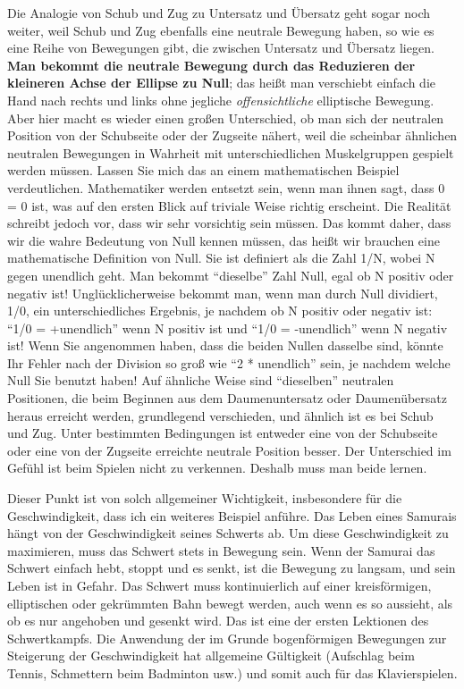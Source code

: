 Die Analogie von Schub und Zug zu Untersatz und Übersatz geht sogar noch weiter, weil Schub und Zug ebenfalls eine neutrale Bewegung haben, so wie es eine Reihe von Bewegungen gibt, die zwischen Untersatz und Übersatz liegen.
\textbf{Man bekommt die neutrale Bewegung durch das Reduzieren der kleineren Achse der Ellipse zu Null}; das heißt man verschiebt einfach die Hand nach rechts und links ohne jegliche \textit{offensichtliche} elliptische Bewegung.
Aber hier macht es wieder einen großen Unterschied, ob man sich der neutralen Position von der Schubseite oder der Zugseite nähert, weil die scheinbar ähnlichen neutralen Bewegungen in Wahrheit mit unterschiedlichen Muskelgruppen gespielt werden müssen.
Lassen Sie mich das an einem mathematischen Beispiel verdeutlichen.
Mathematiker werden entsetzt sein, wenn man ihnen sagt, dass 0 = 0 ist, was auf den ersten Blick auf triviale Weise  richtig erscheint.
Die Realität schreibt jedoch vor, dass wir sehr vorsichtig sein müssen.
Das kommt daher, dass wir die wahre Bedeutung von Null kennen müssen, das heißt wir brauchen eine mathematische Definition von Null.
Sie ist definiert als die Zahl 1/N, wobei N gegen unendlich geht.
Man bekommt \enquote{dieselbe} Zahl Null, egal ob N positiv oder negativ ist!
Unglücklicherweise bekommt man, wenn man durch Null dividiert, 1/0, ein unterschiedliches Ergebnis, je nachdem ob N positiv oder negativ ist: \enquote{1/0 = +unendlich} wenn N positiv ist und \enquote{1/0 = -unendlich} wenn N negativ ist!
Wenn Sie angenommen haben, dass die beiden Nullen dasselbe sind, könnte Ihr Fehler nach der Division so groß wie \enquote{2 * unendlich} sein, je nachdem welche Null Sie benutzt haben!
Auf ähnliche Weise sind \enquote{dieselben} neutralen Positionen, die beim Beginnen aus dem Daumenuntersatz oder Daumenübersatz heraus erreicht werden, grundlegend verschieden, und ähnlich ist es bei Schub und Zug.
Unter bestimmten Bedingungen ist entweder eine von der Schubseite oder eine von der Zugseite erreichte neutrale Position besser.
Der Unterschied im Gefühl ist beim Spielen nicht zu verkennen.
Deshalb muss man beide lernen.

Dieser Punkt ist von solch allgemeiner Wichtigkeit, insbesondere für die Geschwindigkeit, dass ich ein weiteres Beispiel anführe.
Das Leben eines Samurais hängt von der Geschwindigkeit seines Schwerts ab.
Um diese Geschwindigkeit zu maximieren, muss das Schwert stets in Bewegung sein.
Wenn der Samurai das Schwert einfach hebt, stoppt und es senkt, ist die Bewegung zu langsam, und sein Leben ist in Gefahr.
Das Schwert muss kontinuierlich auf einer kreisförmigen, elliptischen oder gekrümmten Bahn bewegt werden, auch wenn es so aussieht, als ob es nur angehoben und gesenkt wird.
Das ist eine der ersten Lektionen des Schwertkampfs.
Die Anwendung der im Grunde bogenförmigen Bewegungen zur Steigerung der Geschwindigkeit hat allgemeine Gültigkeit (Aufschlag beim Tennis, Schmettern beim Badminton usw.) und somit auch für das Klavierspielen.

